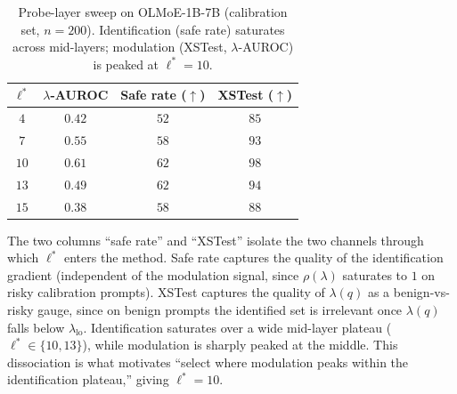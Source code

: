 \begin{table}[h]
\centering
\caption{Probe-layer sweep on OLMoE-1B-7B (calibration set, $n{=}200$). Identification (safe rate) saturates across mid-layers; modulation (XSTest, $\lambda$-AUROC) is peaked at $\ell^* = 10$.}
\label{tab:probe_layer}
\small
\begin{tabular}{cccc}
\toprule
$\ell^*$ & $\lambda$-AUROC & Safe rate ($\uparrow$) & XSTest ($\uparrow$) \\
\midrule
$4$  & $0.42$ & $52$ & $85$ \\
$7$  & $0.55$ & $58$ & $93$ \\
$10$ & $0.61$ & $62$ & $98$ \\
$13$ & $0.49$ & $62$ & $94$ \\
$15$ & $0.38$ & $58$ & $88$ \\
\bottomrule
\end{tabular}
\end{table}

The two columns ``safe rate'' and ``XSTest'' isolate the two channels through which $\ell^*$ enters the method. Safe rate captures the quality of the identification gradient (independent of the modulation signal, since $\rho(\lambda)$ saturates to $1$ on risky calibration prompts). XSTest captures the quality of $\lambda(q)$ as a benign-vs-risky gauge, since on benign prompts the identified set is irrelevant once $\lambda(q)$ falls below $\lambda_{\text{lo}}$. Identification saturates over a wide mid-layer plateau ($\ell^* \in \{10, 13\}$), while modulation is sharply peaked at the middle. This dissociation is what motivates ``select where modulation peaks within the identification plateau,'' giving $\ell^* = 10$.


